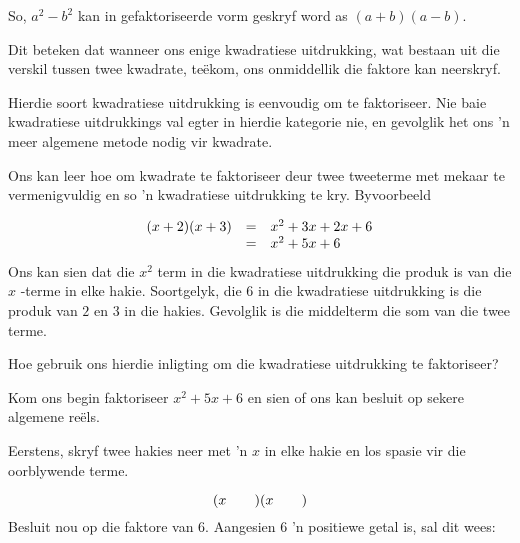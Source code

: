 So, $a^2-b^2$ kan in gefaktoriseerde vorm geskryf word as $(a+b)(a-b)$. \par

Dit beteken dat wanneer ons enige kwadratiese uitdrukking, wat bestaan uit die verskil tussen twee kwadrate, te\"ekom, ons onmiddellik die faktore kan neerskryf.


Hierdie soort kwadratiese uitdrukking is eenvoudig om te faktoriseer. Nie baie kwadratiese uitdrukkings val egter
in hierdie kategorie nie, en gevolglik het ons ’n meer algemene metode nodig vir kwadrate.
\par 
Ons kan leer hoe om kwadrate te faktoriseer deur twee tweeterme met mekaar te vermenigvuldig en so ’n kwadratiese uitdrukking te kry. Byvoorbeeld

\begin{equation*}
\begin{array}{ccl}\hfill (x+2)(x+3)& =& x^2+3x+2x+6 \\ & =& {x}^{2}+5x+6\hfill \end{array}
\end{equation*}
Ons kan sien dat die ${x}^{2}$ term in die kwadratiese uitdrukking die produk is van die $x$ -terme in elke hakie. Soortgelyk, die $6$ in die kwadratiese uitdrukking is die produk van $2$ en $3$ in die hakies. Gevolglik is die middelterm die
som van die twee terme.\par 
Hoe gebruik ons hierdie inligting om die kwadratiese uitdrukking te faktoriseer?\par 
Kom ons begin faktoriseer ${x}^{2}+5x+6$ en sien of ons kan besluit op sekere algemene reëls.\par
 Eerstens, skryf twee hakies neer met ’n $x$ in elke hakie en los spasie vir die oorblywende terme.\par 
\begin{equation*}
(x\phantom{\rule{2.em}{0ex}})(x\phantom{\rule{2.em}{0ex}})
\end{equation*}
Besluit nou op die faktore van $6$. Aangesien $6$ ’n positiewe getal is, sal dit wees:\par 
